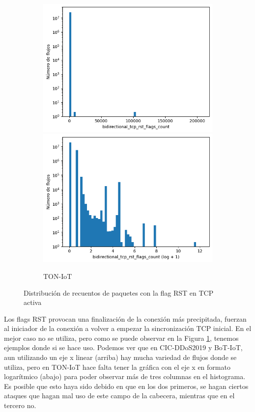 \begin{figure}[H]
\begin{subfigure}[b]{0.32\textwidth}
        \includegraphics[width=\linewidth]{media/packet_pincer_toniot/bidirectional_tcp_rst_flags_count_linear_x_log_y.png}
        \includegraphics[width=\linewidth]{media/packet_pincer_toniot/bidirectional_tcp_rst_flags_count_log_x_log_y.png}
        \caption{TON-IoT}
    \end{subfigure}
    \hfill
       \caption{Distribución de recuentos de paquetes con la flag RST en TCP activa}
       \label{fig:packet_pincer_bidirectional_tcp_rst_flags_count}
\end{figure}

Los flags RST provocan una finalización de la conexión más precipitada, fuerzan al iniciador de la conexión a volver a empezar la sincronización TCP inicial. En el mejor caso no se utiliza, pero como se puede observar en la Figura \ref{fig:packet_pincer_bidirectional_tcp_rst_flags_count}, tenemos ejemplos donde si se hace uso. Podemos ver que en CIC-DDoS2019 y BoT-IoT, aun utilizando un eje x linear (arriba) hay mucha variedad de flujos donde se utiliza, pero en TON-IoT hace falta tener la gráfica con el eje x en formato logarítmico (abajo) para poder observar más de tres columnas en el histograma. Es posible que esto haya sido debido en que en los dos primeros, se hagan ciertos ataques que hagan mal uso de este campo de la cabecera, mientras que en el tercero no.

